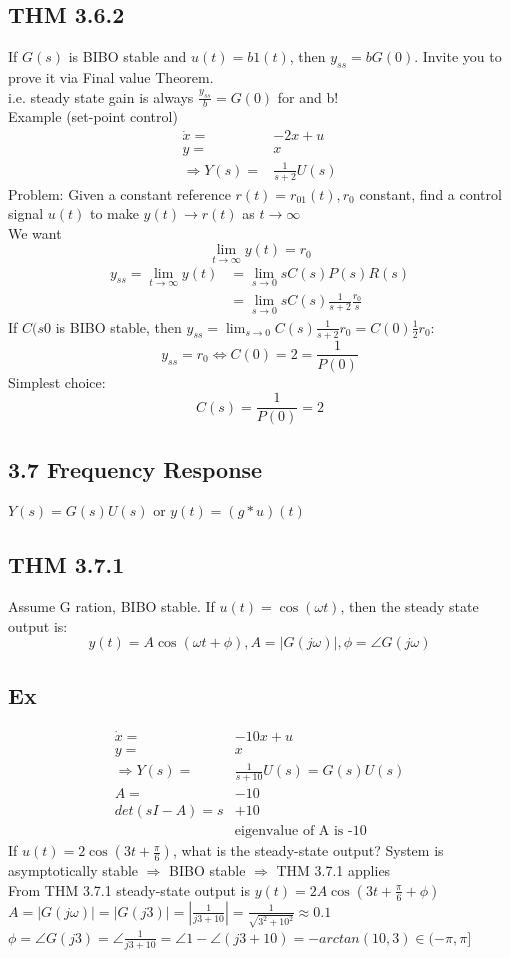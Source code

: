 \documentclass[letterpaper]{article}
\begin{document}
\subsection*{THM 3.6.2}
If $G(s)$ is BIBO stable and $u(t)=b1(t)$, then $y_{ss}=bG(0)$. Invite you to prove it via Final value Theorem.\\
i.e. steady state gain is always $\frac{y_{ss}}{b}=G(0)$ for and b!\\
Example (set-point control)
\begin{align*}
\dot x=&-2x+u\\
y=&x\\
\Rightarrow Y(s)=&\frac{1}{s+2}U(s)
\end{align*}		    
Problem: Given a constant reference $r(t)=r_01(t), r_0$ constant, find a control signal $u(t)$ to make $y(t)\rightarrow r(t)$ as $t\rightarrow \infty$\\
We want $$\lim_{t\rightarrow \infty} y(t)=r_0$$
\begin{align*}
y_{ss}=\lim_{t\rightarrow \infty} y(t) &=\lim_{s\rightarrow 0} sC(s)P(s)R(s)\\
&=\lim_{s\rightarrow 0}sC(s)\frac{1}{s+2}\frac{r_0}{s}
\end{align*}
If $C(s0$ is BIBO stable, then $y_{ss}=\lim_{s\rightarrow 0} C(s)\frac{1}{s+2}r_0=C(0)\frac{1}{2}r_0$: $$y_{ss}=r_0 \iff C(0)=2=\frac{1}{P(0)}$$
Simplest choice: $$C(s)=\frac{1}{P(0)}=2$$
\subsection*{3.7 Frequency Response}
$Y(s) = G(s)U(s)$ or $y(t)=(g*u)(t)$
\subsection*{THM 3.7.1}
Assume G ration, BIBO stable. If $u(t)=\cos(\omega t)$, then the steady state output is: 
$$y(t)=A\cos(\omega t+\phi), A=|G(j\omega)|,\phi=\angle G(j\omega)$$
\subsection*{Ex}
\begin{align*}
\dot x=&-10x+u\\
y=&x\\
\Rightarrow Y(s)=&\frac{1}{s+10}U(s)=G(s)U(s)\\
A=&-10\\
det(sI-A)=s&+10\\
&\text{eigenvalue of A is -10}
\end{align*}
If $u(t)=2\cos(3t+\frac{\pi}{6})$, what is the steady-state output?
System is asymptotically stable $\Rightarrow$ BIBO stable $\Rightarrow$ THM 3.7.1 applies\\
From THM 3.7.1 steady-state output is $y(t)=2A\cos(3t+\frac{\pi}{6}+\phi)$\\
$A=|G(j\omega)|=|G(j3)|=|\frac{1}{j3+10}|=\frac{1}{\sqrt{3^2+10^2}}\approx 0.1$\
$\phi=\angle G(j3)=\angle \frac{1}{j3+10}=\angle 1-\angle (j3+10)=-arctan(10,3)\in (-\pi,\pi]$
\end{document}
